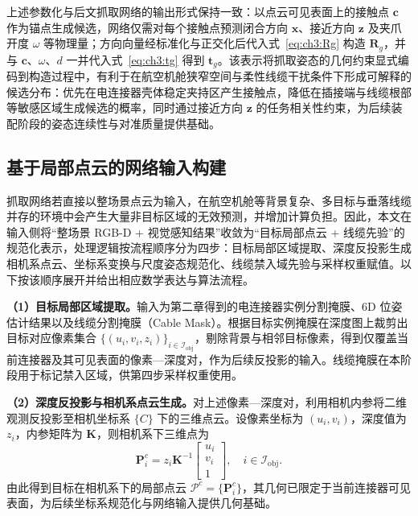 上述参数化与后文抓取网络的输出形式保持一致：以点云可见表面上的接触点 $\mathbf{c}$ 作为锚点生成候选，网络仅需对每个接触点预测闭合方向 $\mathbf{x}$、接近方向 $\mathbf{z}$ 及夹爪开度 $\omega$ 等物理量；方向向量经标准化与正交化后代入式~\eqref{eq:ch3:Rg} 构造 $\mathbf{R}_g$，并与 $\mathbf{c}$、$\omega$、$d$ 一并代入式~\eqref{eq:ch3:tg} 得到 $\mathbf{t}_g$。该表示将抓取姿态的几何约束显式编码到构造过程中，有利于在航空机舱狭窄空间与柔性线缆干扰条件下形成可解释的候选分布：优先在电连接器壳体稳定夹持区产生接触点，降低在插接端与线缆根部等敏感区域生成候选的概率，同时通过接近方向 $\mathbf{z}$ 的任务相关性约束，为后续装配阶段的姿态连续性与对准质量提供基础。

\subsection{基于局部点云的网络输入构建}

抓取网络若直接以整场景点云为输入，在航空机舱等背景复杂、多目标与垂落线缆并存的环境中会产生大量非目标区域的无效预测，并增加计算负担。因此，本文在输入侧将“整场景 RGB-D + 视觉感知结果”收敛为“目标局部点云 + 线缆先验”的规范化表示，处理逻辑按流程顺序分为四步：目标局部区域提取、深度反投影生成相机系点云、坐标系变换与尺度姿态规范化、线缆禁入域先验与采样权重赋值。以下按该顺序展开并给出相应数学表达与算法流程。

\textbf{（1）目标局部区域提取。}输入为第二章得到的电连接器实例分割掩膜、6D 位姿估计结果以及线缆分割掩膜（Cable Mask）。根据目标实例掩膜在深度图上裁剪出目标对应像素集合 $\{(u_i,v_i,z_i)\}_{i\in\mathcal{I}_{\mathrm{obj}}}$，剔除背景与相邻目标像素，得到仅覆盖当前连接器及其可见表面的像素—深度对，作为后续反投影的输入。线缆掩膜在本阶段用于标记禁入区域，供第四步采样权重使用。

\textbf{（2）深度反投影与相机系点云生成。}对上述像素—深度对，利用相机内参将二维观测反投影至相机坐标系 $\{C\}$ 下的三维点云。设像素坐标为 $(u_i,v_i)$，深度值为 $z_i$，内参矩阵为 $\mathbf{K}$，则相机系下三维点为
\begin{equation}
  \mathbf{P}_i^c=z_i\mathbf{K}^{-1}\begin{bmatrix} u_i\\ v_i\\ 1 \end{bmatrix},\quad i\in\mathcal{I}_{\mathrm{obj}}.
  \label{eq:ch3:backproj}
\end{equation}
由此得到目标在相机系下的局部点云 $\mathcal{P}^c=\{\mathbf{P}_i^c\}$，其几何已限定于当前连接器可见表面，为后续坐标系规范化与网络输入提供几何基础。

